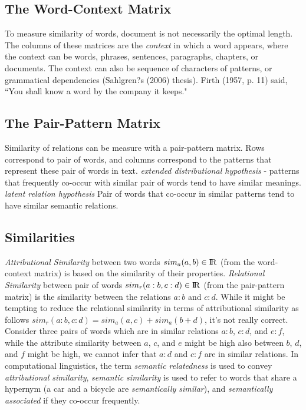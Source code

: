 \documentclass{article}
\begin{document}
\subsection{The Word-Context Matrix}
To measure similarity of words, document is not necessarily the optimal length. The columns of these matrices are the \textit{context} in which a word appears, where the context can be words, phrases, sentences, paragraphs, chapters, or documents. The context can also be sequence of characters of patterns, or grammatical dependencies (Sahlgren?s (2006) thesis). Firth (1957, p. 11) said, ``You shall know a word by the company it keeps."

\subsection{The Pair-Pattern Matrix}
Similarity of relations can be measure with a pair-pattern matrix. Rows correspond to pair of words, and columns correspond to the patterns that represent these pair of words in text. \textit{extended distributional hypothesis} - patterns that frequently co-occur with similar pair of words tend to have similar meanings. \textit{latent relation hypothesis} Pair of words that co-occur in similar patterns tend to have similar semantic relations.

\subsection*{Similarities}
\textit{Attributional Similarity} between two words $ sim_a(a,b) \in {\rm I\!R} $ (from the word-context matrix) is based on the similarity of their properties. \textit{Relational Similarity} between pair of words $ sim_r(a:b,c:d) \in {\rm I\!R} $ (from the pair-pattern matrix) is the similarity between the relations $a:b$ and $c:d$. While it might be tempting to reduce the relational similarity in terms of attributional similarity as follows $sim_r(a:b,c:d) = sim_a(a,c) + sim_a(b+d)$, it's not really correct. Consider three pairs of words which are in similar relations $a:b$, $c:d$, and $e:f$, while the attribute similarity between $a$, $c$, and $e$ might be high also between $b$, $d$, and $f$ might be high, we cannot infer that $a:d$ and $c:f$ are in similar relations. In computational linguistics, the term \textit{semantic relatedness} is used to convey \textit{attributional similarity}, \textit{semantic similarity} is used to refer to words that share a hypernym (a car and a bicycle are \textit{semantically similar}), and \textit{semantically associated} if they co-occur frequently.
\end{document}
